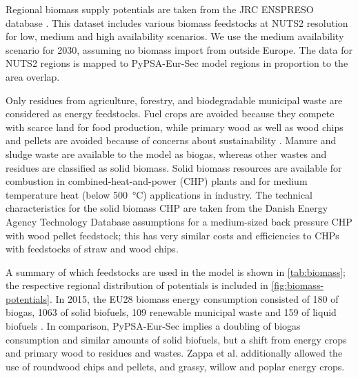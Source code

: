 Regional biomass supply potentials are taken from the JRC ENSPRESO database
. This dataset includes various biomass feedstocks at
NUTS2 resolution for low, medium and high availability scenarios.  We use the
medium availability scenario for 2030, assuming no biomass import from outside
Europe. The data for NUTS2 regions is mapped to PyPSA-Eur-Sec model regions in
proportion to the area overlap.

Only residues from agriculture, forestry, and biodegradable municipal
waste are considered as energy feedstocks. Fuel crops are avoided because they
compete with scarce land for food production, while primary wood as well as wood
chips and pellets are avoided because of concerns about sustainability
.
Manure and sludge waste are available to the model as biogas, whereas other
wastes and residues are classified as solid biomass. Solid biomass resources are
available for combustion in combined-heat-and-power (CHP) plants and for medium
temperature heat (below \SI{500}{\celsius}) applications in industry.
The technical characteristics for the solid biomass CHP are taken from the
Danish Energy Agency Technology Database  assumptions for a
medium-sized back pressure CHP with wood pellet feedstock; this has very similar
costs and efficiencies to CHPs with feedstocks of straw and wood chips.

A summary of which feedstocks are used in the model is shown in
\cref{tab:biomass}; the respective regional distribution of potentials is
included in \cref{fig:biomass-potentials}. In 2015, the EU28 biomass energy
consumption consisted of \SI{180}{\twh} of biogas, \SI{1063}{\twh} of solid
biofuels, \SI{109}{\twh} renewable municipal waste and \SI{159}{\twh} of liquid
biofuels \citeS{}. In comparison, PyPSA-Eur-Sec implies a doubling of biogas
consumption and similar amounts of solid biofuels, but a shift from energy crops
and primary wood to residues and wastes. Zappa et al.
 additionally allowed the use of roundwood chips
and pellets, and grassy, willow and poplar energy crops.

